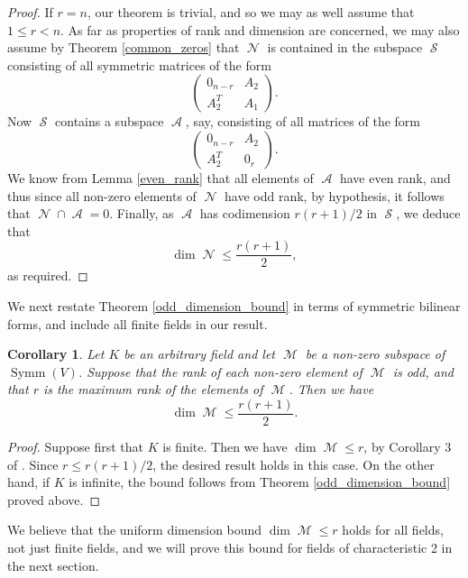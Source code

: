 \documentclass{amsart}
\DeclareMathOperator{\M}{\mathcal{M}}
\DeclareMathOperator{\N}{\mathcal{N}}
\DeclareMathOperator{\Sk}{\mathcal{S}}
\DeclareMathOperator{\A}{\mathcal{A}}
\DeclareMathOperator{\Symm}{Symm}
\theoremstyle{plain}
\newtheorem{corollary}{Corollary}
\theoremstyle{definition}
\begin{document}
\begin{proof}
 
 If $r=n$, our theorem is trivial, and so we may as well assume that $1\leq r<n$. As far as properties of rank and dimension
 are concerned, we may also assume by Theorem \ref{common_zeros} that $\N$ is contained in the subspace $\Sk$ consisting
 of all symmetric matrices of the form
 \[
 \left(
\begin{array}
{cc}
        0_{n-r}&A_2\\
        A_2^T&A_1  
\end{array}
\right).
\] 
Now $\Sk$ contains a subspace $\A$, say, consisting of all matrices of the form
\[
 \left(
\begin{array}
{cc}
        0_{n-r}&A_2\\
        A_2^T&0_r  
\end{array}
\right).
\] 
We know from Lemma \ref{even_rank} that all elements of $\A$ have even rank, and thus since all non-zero elements
of $\N$ have odd rank, by hypothesis, it follows that $\N\cap \A=0$. Finally, as $\A$ has codimension $r(r+1)/2$
in $\Sk$, we deduce that
\[
 \dim \N\leq \frac{r(r+1)}{2},
\]
as required.

\end{proof}

We next restate Theorem \ref{odd_dimension_bound} in terms of symmetric bilinear forms, and include all finite fields
in our result.

\begin{corollary} \label{odd_rank_symmetric_forms}
 Let $K$ be an arbitrary field and let $\M$ be a  non-zero subspace of $\Symm(V)$. 
 Suppose that the rank of each non-zero
element of $\M$ is odd, and that $r$ is the maximum rank of the elements of $\M$. Then we have
\[
 \dim \M\leq \frac{r(r+1)}{2}.
\]
 
\end{corollary}

\begin{proof}
 Suppose first that $K$ is finite. Then we have $\dim \M\leq r$, by Corollary 3 of \cite{Du}. Since $r\leq r(r+1)/2$,
 the desired result holds in this case. On the other hand, if $K$ is infinite, the bound follows from Theorem 
 \ref{odd_dimension_bound} proved above.
\end{proof}

We believe that the uniform dimension bound $\dim \M\leq r$ holds for all fields, not just finite fields, and we will
prove this bound for fields of characteristic 2 in the next section.
\end{document}
